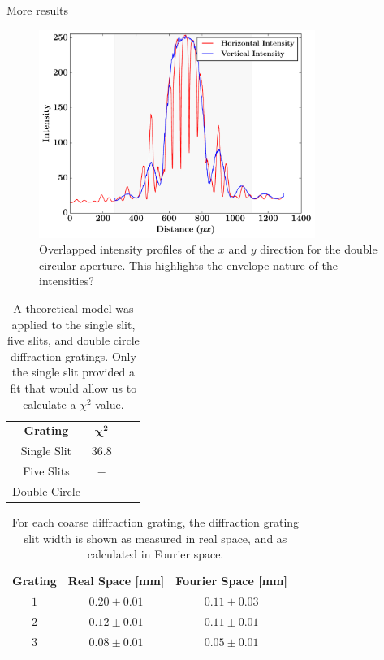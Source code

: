 \documentclass[twocolumn]{revtex4}
\begin{document}
More results

\begin{figure}[!h]
\begin{center}
\includegraphics[width=9cm]{results/double_circle_intensity_overlapped}
\caption[]{Overlapped intensity profiles of the $x$ and $y$ direction for the double circular aperture. This highlights the envelope nature of the intensities?}
\end{center}
\end{figure}

\begin{table}[h!]
\centering
\begin{tabular}{c@{\hskip 20pt}c@{\hskip 20pt}c@{\hskip 20pt}c} 
 \hline
 \textbf{Grating} & $\boldsymbol{\chi^2}$ \\ [0.5ex] 
 Single Slit &$36.8$ \\ 
 Five Slits & $-$ \\
 Double Circle & $-$ \\
 \hline
\end{tabular}
\caption{A theoretical model was applied to the single slit, five slits, and double circle diffraction gratings. Only the single slit provided a fit that would allow us to calculate a $\chi^2$ value.}
\end{table}

\begin{table}[h!]
\centering
\begin{tabular}{c@{\hskip 15pt}c@{\hskip 15pt}c@{\hskip 10pt}c} 
 \hline
 \textbf{Grating} & \textbf{Real Space [mm]} & \textbf{Fourier Space [mm]} \\ [0.5ex] 
 $1$ &$0.20\pm0.01$ & $0.11\pm0.03$ \\ 
 $2$ & $0.12\pm0.01$ & $0.11\pm0.01$ \\
 $3$ & $0.08\pm0.01$ & $0.05\pm0.01$ \\
 \hline
\end{tabular}
\caption{For each coarse diffraction grating, the diffraction grating slit width is shown as measured in real space, and as calculated in Fourier space.}
\end{table}
\end{document}
